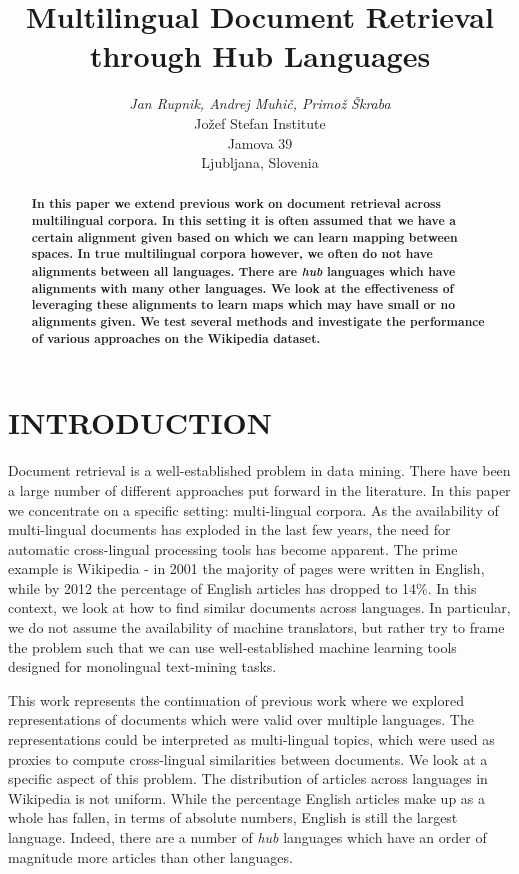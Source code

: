 \documentclass[twocolumn, draft]{article}
\title{Multilingual Document Retrieval through Hub Languages}
\author{{ \it Jan Rupnik, Andrej Muhi\v c, Primo\v z \v Skraba}\\
Jo\v zef Stefan Institute\\
Jamova 39\\
Ljubljana, Slovenia\\
}
\date{}
\begin{document}
\maketitle
\sectionfont{\sc\large\centering\textbf}
\begin{abstract}
\textbf{In this paper we extend previous work on document retrieval
across multilingual corpora. In this setting it is often assumed
that we have a certain alignment given based on which we can
learn mapping between spaces. In true multilingual corpora
however, we often do not have alignments between all
languages. There are \emph{hub} languages which
have alignments with many other languages. We look at the
effectiveness of leveraging these alignments to learn maps which
may have small or no alignments given. We test several methods
and investigate the performance of various approaches on the
Wikipedia dataset.}

\end{abstract}
\sectionfont{\large\textbf\sc}
\vspace{-0.2cm}
\section{INTRODUCTION}
\vspace{-0.2cm}
Document retrieval is a well-established problem in data
mining. There have been a large number of different approaches
put forward in the literature. In this paper we concentrate on a
specific setting: multi-lingual corpora. As the availability of
multi-lingual documents has exploded in the last few years, the
need for automatic cross-lingual processing tools has become apparent.
%
The prime example is Wikipedia - in 2001 the majority of pages
were written in English, while by 2012 the percentage of English
articles has dropped to 14\%. In this context, we look at how to
find similar documents across languages. In particular, we do not
assume the availability of machine translators, but rather try to
frame the problem such that we can use well-established machine
learning tools designed for monolingual text-mining tasks.

This work represents the continuation of previous work \cite{nips, iti}
where we explored representations of documents which were valid
over multiple languages.  The representations could be interpreted
as multi-lingual topics, which were used as proxies to compute
cross-lingual similarities between documents.
%
We look at a specific aspect of this problem. The
distribution of articles across languages in Wikipedia is not
uniform. While the percentage English articles make up as a whole
has fallen, in terms of absolute numbers, English is still the
largest language. Indeed, there are a number of \emph{hub}
languages which have an order of magnitude more articles than
other languages.
\end{document}
